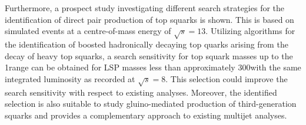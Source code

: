 Furthermore, a prospect study investigating different search strategies for the identification of direct pair production of top squarks is shown. This is based on simulated events at a centre-of-mass energy of $\sqrt{s}=13$\tev. Utilizing algorithms for the identification of boosted hadronically decaying top quarks arising from the decay of heavy top squarks, a search sensitivity for top squark masses up to the 1\tev range can be obtained for LSP masses less than approximately 300\gev with the same integrated luminosity as recorded at $\sqrt{s}=8$\tev. This selection could improve the search sensitivity with respect to existing analyses. Moreover, the identified selection is also suitable to study gluino-mediated production of third-generation squarks and provides a complementary approach to existing multijet analyses.      
